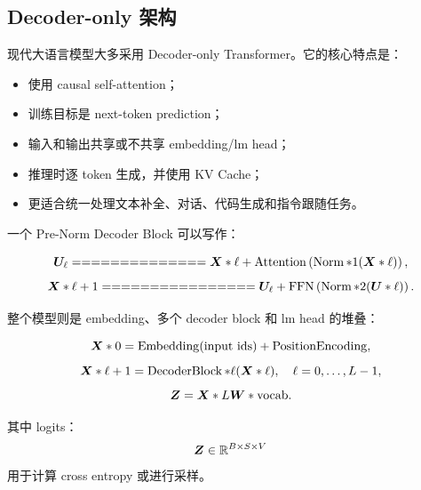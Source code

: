 \subsection{Decoder-only 架构}
\label{subsec:decoder-only-architecture}

现代大语言模型大多采用 Decoder-only Transformer。它的核心特点是：

\begin{itemize}
\item 使用 causal self-attention；
\item 训练目标是 next-token prediction；
\item 输入和输出共享或不共享 embedding/lm head；
\item 推理时逐 token 生成，并使用 KV Cache；
\item 更适合统一处理文本补全、对话、代码生成和指令跟随任务。
\end{itemize}

一个 Pre-Norm Decoder Block 可以写作：

\[
\mat{U}_{\ell}
==============

\mat{X}*{\ell}
+
\operatorname{Attention}
\left(
\operatorname{Norm}*1(\mat{X}*{\ell})
\right),
\]
\[
\mat{X}*{\ell+1}
================

\mat{U}_{\ell}
+
\operatorname{FFN}
\left(
\operatorname{Norm}*2(\mat{U}*{\ell})
\right).
\]

整个模型则是 embedding、多个 decoder block 和 lm head 的堆叠：

\[
\bm{X}*0=\operatorname{Embedding}(\text{input ids})+\operatorname{PositionEncoding},
\]
\[
\bm{X}*{\ell+1}=\operatorname{DecoderBlock}*{\ell}(\bm{X}*{\ell}),
\quad
\ell=0,\ldots,L-1,
\]
\[
\bm{Z}=\bm{X}*{L}\bm{W}*{\mathrm{vocab}}.
\]

其中 logits：
\[
\bm{Z}\in\mathbb{R}^{B\times S\times V}
\]
用于计算 cross entropy 或进行采样。

